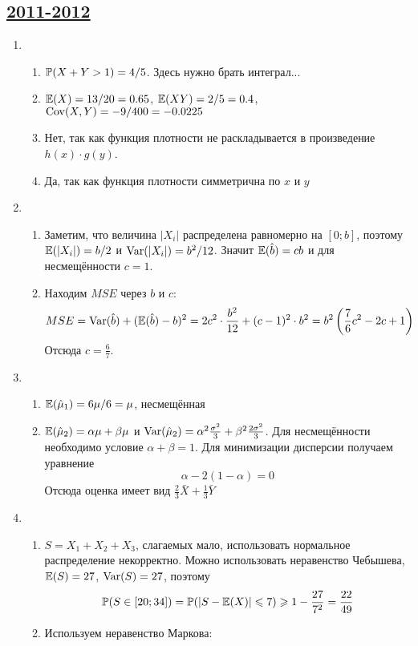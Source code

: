 \subsection[2011-2012]{\hyperref[sec:kr_02_2011_2012]{2011-2012}}
\label{sec:sol_kr_02_2011_2012}

\begin{enumerate}
\item
\begin{enumerate}
\item $\P(X + Y > 1) = 4/5$. Здесь нужно брать интеграл...
\item $\E(X) = 13/20 = 0.65$, $\E(XY) = 2/5 = 0.4$, $\Cov(X, Y) = -9/400 = -0.0225$
\item Нет, так как функция плотности не раскладывается в произведение $h(x) \cdot g(y)$.
\item Да, так как функция плотности симметрична по $x$ и $y$
\end{enumerate}
\item
\begin{enumerate}
\item Заметим, что величина $|X_i|$ распределена равномерно на $[0; b]$,
поэтому $\E(|X_i|) = b/2$ и $\Var(|X_i|) = b^2/12$. Значит $\E(\hat{b}) = cb$ и для
несмещённости $c = 1$.
\item Находим $MSE$ через $b$ и $c$:
\[
MSE=\Var(\hat{b})+(\E(\hat{b})-b)^2=2c^2\cdot \frac{b^2}{12}+(c-1)^2\cdot b^2=b^2\left(\frac{7}{6}c^2-2c+1\right)
\]
Отсюда $c=\frac{6}{7}$.
\end{enumerate}
\item
\begin{enumerate}
\item $\E(\hat{\mu}_1)=6\mu/6=\mu$, несмещённая
\item $\E(\hat{\mu}_2)=\alpha \mu+\beta \mu$ и $\Var(\hat{\mu}_2)=\alpha^2 \frac{\sigma^2}{3}+\beta^2 \frac{2\sigma^2}{3}$.
Для несмещённости необходимо условие $\alpha+\beta=1$. Для минимизации дисперсии
получаем уравнение
\[
\alpha-2(1-\alpha)=0
\]
Отсюда оценка имеет вид $\frac{2}{3}\bar{X}+\frac{1}{3}\bar{Y}$
\end{enumerate}
\item
\begin{enumerate}
\item $S=X_1+X_2+X_3$, слагаемых мало, использовать нормальное распределение
некорректно. Можно использовать неравенство Чебышева, $\E(S)=27$, $\Var(S)=27$, поэтому
\[
\P(S\in [20;34])=\P( |S-\E(X)| \leq 7) \geq 1-\frac{27}{7^2}=\frac{22}{49}
\]
\item Используем неравенство Маркова:

\end{enumerate}
\end{enumerate}
